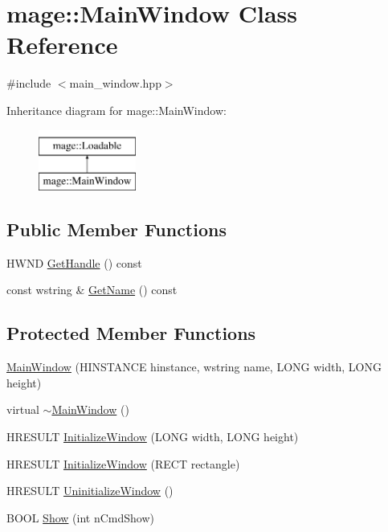 \hypertarget{classmage_1_1_main_window}{}\section{mage\+:\+:Main\+Window Class Reference}
\label{classmage_1_1_main_window}


{\ttfamily \#include $<$main\+\_\+window.\+hpp$>$}

Inheritance diagram for mage\+:\+:Main\+Window\+:\begin{figure}[H]
\begin{center}
\leavevmode
\includegraphics[height=2.000000cm]{classmage_1_1_main_window}
\end{center}
\end{figure}
\subsection*{Public Member Functions}
\begin{DoxyCompactItemize}
\item 
H\+W\+ND \hyperlink{classmage_1_1_main_window_acfaa88503f2c5e4a05aa9fa9698d2735}{Get\+Handle} () const
\item 
const wstring \& \hyperlink{classmage_1_1_main_window_aa2b99118a5125d4effbd5c5d9352e7e0}{Get\+Name} () const
\end{DoxyCompactItemize}
\subsection*{Protected Member Functions}
\begin{DoxyCompactItemize}
\item 
\hyperlink{classmage_1_1_main_window_a245e387a79d5957c01c8e10cc083b346}{Main\+Window} (H\+I\+N\+S\+T\+A\+N\+CE hinstance, wstring name, L\+O\+NG width, L\+O\+NG height)
\item 
virtual \hyperlink{classmage_1_1_main_window_ada7ecf97d82ce08ba2f31f0afd891031}{$\sim$\+Main\+Window} ()
\item 
H\+R\+E\+S\+U\+LT \hyperlink{classmage_1_1_main_window_a167b4c2771e6caa819045cf75f9bba5f}{Initialize\+Window} (L\+O\+NG width, L\+O\+NG height)
\item 
H\+R\+E\+S\+U\+LT \hyperlink{classmage_1_1_main_window_a74e01363d59c22597449edfc524a504e}{Initialize\+Window} (R\+E\+CT rectangle)
\item 
H\+R\+E\+S\+U\+LT \hyperlink{classmage_1_1_main_window_aa1ba43fc0a12ea43636fe0e62242a47d}{Uninitialize\+Window} ()
\item 
B\+O\+OL \hyperlink{classmage_1_1_main_window_a78cd939882d89a40a1cdd9308253811d}{Show} (int n\+Cmd\+Show)
\end{DoxyCompactItemize}
